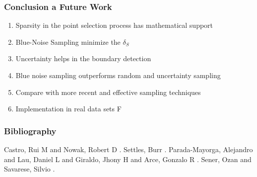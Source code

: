 \documentclass[11pts]{beamer}
\begin{document}
\begin{frame}%
\frametitle{Conclusion a Future Work }

\begin{enumerate} 
    \item Sparsity in the point selection process has mathematical support
    \item Blue-Noise Sampling minimize the $\delta_{S}$
    \item Uncertainty  helps in the boundary detection
    \item Blue noise sampling outperforms random and uncertainty sampling
    \item Compare with more recent and effective sampling techniques
    \item Implementation in real data sets
F\end{enumerate}
\end{frame}



\begin{frame}
\frametitle{Bibliography}

\begin{small}
    
\begin{thebibliography}{10}
\alert{Castro, Rui M and Nowak, Robert D}
.
\alert{Settles, Burr}
.
\alert{Parada-Mayorga, Alejandro and Lau, Daniel L and Giraldo, Jhony H and Arce, Gonzalo R}
.
\alert{Sener, Ozan and Savarese, Silvio}
.

\end{thebibliography}

\end{small}

\end{frame}
\end{document}
